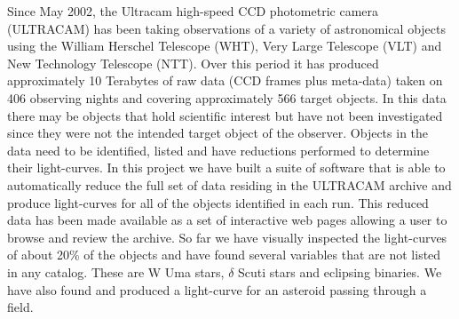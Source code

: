 Since May 2002, the  Ultracam high-speed CCD photometric camera (ULTRACAM) has been taking observations of a variety of astronomical objects using the William Herschel Telescope (WHT), Very Large Telescope (VLT) and New Technology Telescope (NTT). Over this period it has produced approximately 10 Terabytes of raw data (CCD frames plus meta-data) taken on 406 observing nights and covering approximately 566 target objects. In this data there may be objects that hold scientific interest but have not been investigated since they were not the intended target object of the observer. Objects in the data need to be identified, listed and have reductions performed to determine their light-curves. In this project we have built a suite of software that is able to automatically reduce the full set of data residing in the ULTRACAM archive and produce light-curves for all of the objects identified in each run. This reduced data has been made available as a set of interactive web pages allowing a user to browse and review the archive. So far we have visually inspected the light-curves of about 20\% of the objects and have found several variables that are not listed in any catalog. These are {W Uma} stars, $\delta$ Scuti stars and eclipsing binaries. We have also found and produced a light-curve for an asteroid passing through a field. 
